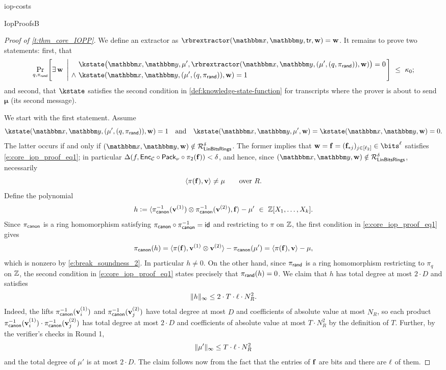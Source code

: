 \begin{lncsappendix}{iop-costs}
\begin{lncsmove}{IopProofsB}
\begin{proof}[Proof of \cref{t:thm_core_IOPP}]
We define an extractor as $\rbrextractor(\inp,\lncsbreak\oracle,\lncsbreak\tr,\ww)=\ww$. It remains to prove two statements: first, that
%
\[
  \Pr_{q,\pirand}\!\left[
  \exists\,\ww \ \left| \ \begin{aligned}
  &\kstate\bigl(\inp,\oracle,\mu',\rbrextractor(\inp,\lncsbreak\oracle,\lncsbreak(\mu', (q,\pirand)),\ww)\bigr)=0\\
  \wedge\ &\kstate(\inp,\lncsbreak\oracle,\lncsbreak(\mu', (q,\pirand)), \ww)=1
  \end{aligned}
  \right.\right]
  \ \le\ \kappa_0;
\]
and second, that $\kstate$ satisfies the second condition in \cref{def:knowledge-state-function} for transcripts where the prover is about to send $\bm{\mu}$ (its second message).

\bigskip

We start with the first statement. Assume $$\kstate(\inp,\lncsbreak\oracle,\lncsbreak(\mu', (q,\pirand)), \ww)=1 \quad \text{and} \quad \kstate(\inp,\lncsbreak\oracle,\lncsbreak\mu',  \ww)=\kstate(\inp,\lncsbreak\oracle,\lncsbreak\ww)=0.$$
The latter occurs if and only if  $(\inp,\oracle,\ww)\notin \LinBitsDual^{\delta}$. The former implies that $\ww=\bff=(\bff_{*j})_{j\in[\codedim_2]}\in \bits^\codedim$ satisfies \eqref{e:core_iop_proof_eq1}; in particular $\Delta(f,\mathsf{Enc}_{\mathcal{C}}\circ\mathsf{Pack}_\nu\circ \pi_2(\mathbf{f}))< \delta$, and hence, since $(\inp,\oracle,\ww)\notin \LinBitsDual^{\delta}$, necessarily
%
\begin{equation}\label{e:break_soundness_2}
\langle \pi(\mathbf{f}), \mathbf{v}\rangle \neq \mu \qquad \text{over } R.
\end{equation}
%
Define the polynomial $$h{\;\vcentcolon=\;}  \langle \pi_{\mathsf{canon}}^{-1}(\mathbf{v}^{(1)}) \otimes \pi_{\mathsf{canon}}^{-1}(\mathbf{v}^{(2)}), \mathbf{f} \rangle- \mu' \ \in \ \mathbb{Z}[X_1, \ldots, X_{k}].
$$
Since $\pi_{\mathsf{canon}}$ is a ring homomorphism satisfying $\pi_{\mathsf{canon}}\circ \pi_{\mathsf{canon}}^{-1}=\mathsf{id}$ and restricting to $\pi$ on $\mathbb{Z}$, the first condition in \eqref{e:core_iop_proof_eq1} gives $$\pi_{\mathsf{canon}}(h) = \langle \pi(\mathbf{f}), \mathbf{v}^{(1)} \otimes \mathbf{v}^{(2)} \rangle- \pi_{\mathsf{canon}}(\mu') = \langle \pi(\mathbf{f}), \mathbf{v}\rangle - \mu,$$ which is nonzero by \eqref{e:break_soundness_2}. In particular $h\neq 0$. On the other hand, since $\pi_{\mathsf{rand}}$ is a ring homomorphism restricting to $\pi_q$ on $\mathbb{Z}$, the second condition in \eqref{e:core_iop_proof_eq1} states precisely that $\pi_{\mathsf{rand}}(h)=0$. We claim that $h$ has total degree at most $2\cdot D$ and satisfies $$\lVert h \rVert_{\infty}\leq 2\cdot T\cdot \ell\cdot N_R^2.$$ Indeed, the lifts $\pi_{\mathsf{canon}}^{-1}(\mathbf{v}^{(1)}_i)$ and $\pi_{\mathsf{canon}}^{-1}(\mathbf{v}^{(2)}_j)$ have total degree at most $D$ and coefficients of absolute value at most $N_R$, so each product $\pi_{\mathsf{canon}}^{-1}(\mathbf{v}^{(1)}_i)\cdot \pi_{\mathsf{canon}}^{-1}(\mathbf{v}^{(2)}_j)$ has total degree at most $2\cdot D$ and coefficients of absolute value at most $T\cdot N_R^2$ by the definition of $T$. Further, by the verifier's checks in Round 1, $$\lVert \mu'\rVert_{\infty} \leq T\cdot \ell\cdot N_R^2$$ and the total degree of $\mu'$ is at most $2\cdot D$. The claim follows now from the fact that the entries of $\mathbf{f}$ are bits and there are $\ell$ of them.



\end{proof}
\end{lncsmove}
\end{lncsappendix}
